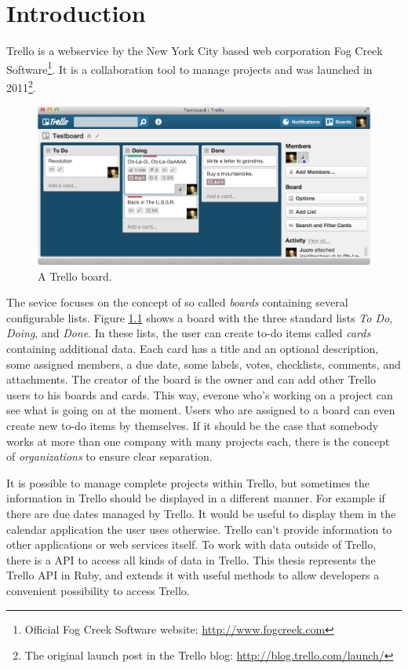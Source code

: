 \onehalfspacing
\chapter{Introduction}
\label{Introduction}
Trello is a webservice by the New York City based web corporation Fog Creek Software\footnote{Official Fog Creek Software website: \url{http://www.fogcreek.com}}. It is a collaboration tool to manage projects and was launched in 2011\footnote{The original launch post in the Trello blog: \url{http://blog.trello.com/launch/}}. 

\begin{figure}[htb]
\centering
\includegraphics[width=\textwidth]{figures/trello}
\caption{A Trello board.}
\label{fig:trello}
\end{figure}

The sevice focuses on the concept of so called \emph{boards} containing several configurable lists. Figure \ref{fig:trello} shows a board with the three standard lists \emph{To Do}, \emph{Doing}, and \emph{Done}. In these lists, the user can create to-do items called \emph{cards} containing additional data. Each card has a title and an optional description, some assigned members, a due date, some labels, votes, checklists, comments, and attachments. The creator of the board is the owner and can add other Trello users to his boards and cards. This way, everone who's working on a project can see what is going on at the moment. Users who are assigned to a board can even create new to-do items by themselves. If it should be the case that somebody works at more than one company with many projects each, there is the concept of \emph{organizations} to ensure clear separation.

It is possible to manage complete projects within Trello, but sometimes the information in Trello should be displayed in a different manner. For example if there are due dates managed by Trello. It would be useful to display them in the calendar application the user uses otherwise. Trello can't provide information to other applications or web services itself. To work with data outside of Trello, there is a API to access all kinds of data in Trello. This thesis represents the Trello API in Ruby, and extends it with useful methods to allow developers a convenient possibility to access Trello.

